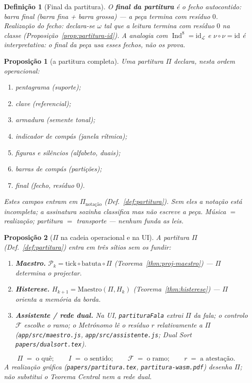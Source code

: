 \documentclass[11pt,a4paper]{article}
\newtheorem{definicao}{Definição}
\newtheorem{proposicao}{Proposição}
\newcommand{\code}[1]{\texttt{#1}}
\begin{document}
\begin{definicao}[Final da partitura]\label{def:final}
O \textbf{final da partitura} é o fecho autocontido: barra final
(barra fina + barra grossa) --- a peça termina com resíduo $0$.
\emph{Realização do fecho:} declara-se $\omega$ tal que a leitura
termina com resíduo $0$ na classe (Proposição~\ref{prop:partitura-id}).
A analogia com $\operatorname{Ind}^{8}=\mathrm{id}_{\mathcal L}$ e
$\nu\circ\nu=\mathrm{id}$ é interpretativa: o final da peça
\emph{usa} esses fechos, não os prova.
\end{definicao}

\begin{proposicao}[a partitura completa]\label{prop:partitura-completa}
Uma partitura $\Pi$ declara, nesta ordem operacional:
\begin{enumerate}
\item pentagrama (suporte);
\item clave (referencial);
\item armadura (semente tonal);
\item indicador de compás (janela rítmica);
\item figuras e silêncios (alfabeto, duais);
\item barras de compás (partições);
\item final (fecho, resíduo $0$).
\end{enumerate}
Estes campos entram em $\Pi_{\mathrm{notação}}$
(Def.~\ref{def:partitura}). Sem eles a notação está incompleta;
a assinatura sozinha classifica mas não escreve a peça. Música $=$
realização; partitura $=$ transporte --- nenhum funda as leis.
\end{proposicao}

\begin{proposicao}[$\Pi$ na cadeia operacional e na UI]\label{prop:pi-cadeia}
A partitura $\Pi$ (Def.~\ref{def:partitura}) entra em três sítios sem
os fundir:
\begin{enumerate}
\item \textbf{Maestro.}
$\mathcal{P}_k=\mathrm{tick}\circ\mathrm{batuta}\circ\Pi$
(Teorema~\ref{thm:proj-maestro}) --- $\Pi$ determina o projectar.
\item \textbf{Histerese.} $H_{k+1}=\mathrm{Maestro}(\Pi,H_k)$
(Teorema~\ref{thm:histerese}) --- $\Pi$ orienta a memória da borda.
\item \textbf{Assistente / rede dual.} Na UI,
\code{partituraFala} extrai $\Pi$ da fala; o controlo
$\mathcal{F}$ escolhe o ramo; o Metrónomo lê o resíduo $r$
relativamente a $\Pi$ (\code{app/src/maestro.js},
\code{app/src/assistente.js}; Dual Sort
\code{papers/dualsort.tex}).
\end{enumerate}
\[
\boxed{
\Pi
\;=\;
\text{o quê};
\qquad
I
\;=\;
\text{o sentido};
\qquad
\mathcal{F}
\;=\;
\text{o ramo};
\qquad
r
\;=\;
\text{a atestação}.
}
\]
A realização gráfica (\code{papers/partitura.tex},
\code{partitura-wasm.pdf}) desenha $\Pi$; não substitui o Teorema
Central nem a rede dual.
\end{proposicao}
\end{document}
